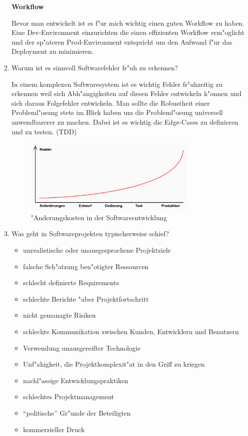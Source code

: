 \begin{enumerate}
\textbf{Workflow}

Bevor man entwickelt ist es f"ur mich wichtig einen guten Workflow zu haben. Eine Dev-Environment einzurichten die einen effizienten Workflow erm"oglicht und der sp"ateren Prod-Environment entspricht um den Aufwand f"ur das Deployment zu minimieren.


\item Warum ist es sinnvoll Softwarefehler fr"uh zu erkennen?
\smallbreak

In einem komplexen Softwaresystem ist es wichtig Fehler fr"uhzeitig zu erkennen weil sich Abh"angigkeiten auf diesen Fehler entwickeln k"onnen und sich daraus Folgefehler entwickeln. Man sollte die Robustheit einer Probleml"osung stets im Blick haben um die Probleml"osung universell anwendbarerer zu machen. Dabei ist es wichtig die Edge-Cases zu definieren und zu testen. (TDD)
\begin{figure}[H]
  \centering
  \includegraphics[width=0.8\textwidth]{./images/Aenderungskosten.png}
  \captionsetup{name=Abb.,font=footnotesize}
  \caption{"Anderungskosten in der Softwareentwicklung}
\end{figure}

\newpage
\item Was geht in Softwareprojekten typischerweise schief?

\begin{itemize}
\item unrealistische oder unausgesprochene Projektziele
\item falsche Sch"atzung ben"otigter Ressourcen
\item schlecht definierte Requirements
\item schlechte Berichte "uber Projektfortschritt
\item nicht gemanagte Risiken
\item schlechte Kommunikation zwischen Kunden, Entwicklern und Benutzern
\item Verwendung unausgereifter Technologie
\item Unf"ahigkeit, die Projektkomplexit"at in den Griff zu kriegen
\item nachl"assige Entwicklungspraktiken
\item schlechtes Projektmanagement
\item ``politische'' Gr"unde der Beteiligten
\item kommerzieller Druck
\end{itemize}



\end{enumerate}
